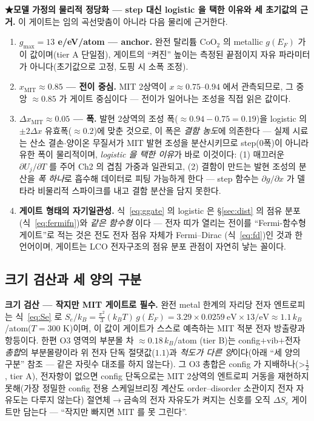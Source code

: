 \textbf{★모델 가정의 물리적 정당화 --- step 대신 logistic 을 택한 이유와 세 초기값의 근거.} 이 게이트는 임의 곡선맞춤이 아니라
다음 물리에 근거한다.
\begin{enumerate}[label=(\roman*),leftmargin=2.2em,itemsep=2pt]
\item \textbf{$g_{\max}=13$ e/eV/atom --- anchor.} 완전 탈리튬 $\mathrm{CoO_2}$ 의 metallic $g(E_F)$ 가 이 값이며(tier A 단일점)\cite{motohashi2009}, 게이트의
``켜진'' 높이는 측정된 끝점이지 자유 파라미터가 아니다(초기값으로 고정, 도핑 시 소폭 조정).
\item \textbf{$x_\mathrm{MIT}\approx0.85$ --- 전이 중심.} MIT 2상역이 $x\approx0.75$--$0.94$ 에서 관측되므로\cite{menetrier1999,reimers1992},
그 중앙 $\approx0.85$ 가 게이트 중심이다 --- 전이가 일어나는 조성을 직접 읽은 값이다.
\item \textbf{$\Delta x_\mathrm{MIT}\approx0.05$ --- 폭.} 발현 2상역의 조성 폭($\approx0.94{-}0.75=0.19$)을 logistic 의 $\pm2\Delta x$ 유효폭($\approx0.2$)에 맞춘
것으로, 이 폭은 \emph{결함 농도}에 의존한다 --- 실제 시료는 산소 결손$\cdot$양이온 무질서가 MIT 발현 조성을
분산시키므로 step(0폭)이 아니라 유한 폭이 물리적이며, \emph{logistic 을 택한 이유}가 바로 이것이다: (1) 매끄러운
$\partial U_j/\partial T$ 를 주어 Ch2 의 겹침 가중과 일관되고, (2) 결함이 만드는 발현 조성의 분산을 \emph{폭
하나}로 흡수해 데이터로 피팅 가능하게 한다 --- step 함수는 $\partial g/\partial x$ 가 델타라 비물리적 스파이크를
내고 결함 분산을 담지 못한다.
\item \textbf{게이트 형태의 자기일관성.} 식~\eqref{eq:ggate} 의 logistic 은 \S\ref{sec:dist} 의 점유 분포(식~\eqref{eq:fermifn})와 \emph{같은 함수형}
이다 --- 전자 띠가 열리는 전이를 ``Fermi-함수형 게이트''로 적는 것은 전도 전자 점유 자체가 Fermi--Dirac
(식~\eqref{eq:fd})인 것과 한 언어이며, 게이트는 LCO 전자구조의 점유 분포 관점이 자연히 낳는 꼴이다.
\end{enumerate}

\subsection{크기 검산과 세 양의 구분}\label{sec:lco-Se-scale}
\textbf{크기 검산 --- 작지만 MIT 게이트로 필수.} 완전 metal 한계의 자리당 전자 엔트로피는 식~\eqref{eq:Se} 로 $S_e/k_B=\tfrac{\pi^2}{3}(k_BT)\,g(E_F)
=3.29\times0.0259\ \mathrm{eV}\times13/\mathrm{eV}\approx1.1\,k_B$/atom($T{=}300$ K)이며, 이 값이 게이트가
스스로 예측하는 MIT 적분 전자 방출량과 항등이다. 한편 O3 영역의 부분몰 차 $\approx0.18\,k_B$/atom
\cite{reynier2004}(tier B)는 config$+$vib$+$전자 \emph{총합}의 부분몰량이라 위 전자 단독 절댓값($1.1$)과
\emph{척도가 다른 양}이다(아래 ``세 양의 구분'' 참조 --- 같은 자릿수 대조를 하지 않는다). 그 O3 총합은 config 가
지배하나(>$\tfrac12$\cite{reynier2004}, tier A), 전자항이 없으면 config 단독으로는 MIT 2상역의 엔트로피 거동을
재현하지 못해(가장 정밀한 config 전용 스케일브리징 계산\cite{ml2024}도 order--disorder 소관이지 전자
자유도는 다루지 않는다) 절연체$\to$금속의 전자 자유도가 켜지는 신호를 오직 $\Delta S_e$ 게이트만
담는다 --- ``작지만 빠지면 MIT 를 못 그린다''.

